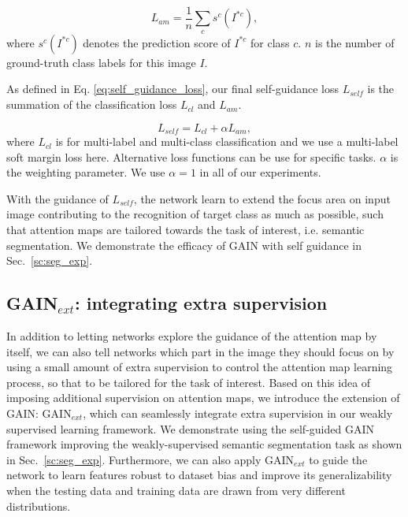 \documentclass[10pt,twocolumn,letterpaper]{article}
\begin{document}
\begin{equation}
\label{eq:loss_croped}
{L_{am}} = \frac{1}{n}\sum\limits_c {{s^c}({I^{*c}})},
\end{equation}
where ${{s^c}({I^{*c}})}$ denotes the prediction score of $I^ {*c}$ for class $c$.  $n$ is the number of ground-truth class labels for this image $I$. 

As defined in Eq. \ref{eq:self_guidance_loss}, our final self-guidance loss $L_{self}$ is the summation of the classification loss $L_{cl}$ and $L_{am}$.



\begin{equation}
\label{eq:self_guidance_loss}
{L_{self}} = {L_{cl}} + \alpha{L_{am}},
\end{equation}
where ${L_{cl}}$ is for multi-label and multi-class classification and we use a multi-label soft margin loss here. Alternative loss functions can be use for specific tasks. $\alpha$ is the weighting parameter. We use $\alpha = 1$ in all of our experiments. 

With the guidance of $L_{self}$, the network learn to extend the focus area on input image contributing to the recognition of target class as much as possible, such that attention maps are tailored towards the task of interest, i.e. semantic segmentation. We demonstrate the efficacy of GAIN with self guidance in Sec.~\ref{sc:seg_exp}. 



\subsection{GAIN$_{ext}$: integrating extra supervision} \label{section:method_human_guided}

In addition to letting networks explore the guidance of the attention map by itself, we can also tell networks which part in the image they should focus on by using a small amount of extra supervision to control the attention map learning process, so that to be tailored for the task of interest. Based on this idea of imposing additional supervision on attention maps, we introduce the extension of GAIN: GAIN$_{ext}$, which can seamlessly integrate extra supervision in our weakly supervised learning framework. We demonstrate using the self-guided GAIN framework improving the weakly-supervised semantic segmentation task as shown in Sec.~\ref{sc:seg_exp}. Furthermore, we can also apply GAIN$_{ext}$ to guide the network to learn features robust to dataset bias and improve its generalizability when the testing data and training data are drawn from very different distributions.
\end{document}
